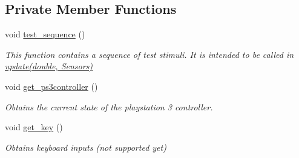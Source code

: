 \subsection*{\-Private \-Member \-Functions}
\begin{DoxyCompactItemize}
\item 
\hypertarget{classSIL_ad2aea8d97e12b77f5438d40b91514336}{void \hyperlink{classSIL_ad2aea8d97e12b77f5438d40b91514336}{test\-\_\-sequence} ()}\label{classSIL_ad2aea8d97e12b77f5438d40b91514336}

\begin{DoxyCompactList}\small\item\em \-This function contains a sequence of test stimuli. \-It is intended to be called in \hyperlink{classSIL_a6a7c1fe2a8b2e251c392569129fc06ea}{update(double, Sensors)} \end{DoxyCompactList}\item 
\hypertarget{classSIL_ab1f50cad8ee00ead398a145974827b29}{void \hyperlink{classSIL_ab1f50cad8ee00ead398a145974827b29}{get\-\_\-ps3controller} ()}\label{classSIL_ab1f50cad8ee00ead398a145974827b29}

\begin{DoxyCompactList}\small\item\em \-Obtains the current state of the playstation 3 controller. \end{DoxyCompactList}\item 
\hypertarget{classSIL_a8260a0d9fcac749ac23fe0f945f60af9}{void \hyperlink{classSIL_a8260a0d9fcac749ac23fe0f945f60af9}{get\-\_\-key} ()}\label{classSIL_a8260a0d9fcac749ac23fe0f945f60af9}

\begin{DoxyCompactList}\small\item\em \-Obtains keyboard inputs (not supported yet) \end{DoxyCompactList}\end{DoxyCompactItemize}
